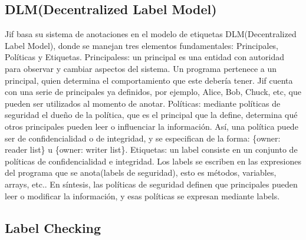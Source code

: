 \subsection{DLM(Decentralized Label Model)}
Jif basa su sistema de anotaciones en el modelo de etiquetas DLM(Decentralized
Label Model), donde se manejan tres elementos fundamentales: Principales,
Políticas y Etiquetas.\newline
Principaless: un principal es una entidad con autoridad para observar y cambiar
aspectos del sistema. Un programa pertenece a un principal, quien determina el
comportamiento que este debería tener. Jif cuenta con una serie de principales ya
definidos, por ejemplo, Alice, Bob, Chuck, etc, que pueden ser
utilizados al momento de anotar.\newline 
Políticas: mediante políticas de seguridad el dueño de la política, que es el
principal que la define, determina qué otros principales pueden leer o
influenciar la información. Así, una política puede ser de confidencialidad o de
integridad, y se especifican de la forma: \{owner: reader list\} u
\{owner: writer list\}.\newline 
Etiquetas: un label consiste en un conjunto de políticas de confidencialidad e
integridad. Los labels se escriben en las expresiones del programa que se
anota(labels de seguridad), esto es métodos, variables, arrays, etc..\newline 
En síntesis, las políticas de seguridad definen que principales pueden leer o
modificar la información, y esas políticas se expresan mediante labels.

\subsection{Label Checking}
\label{subsec: pc}

